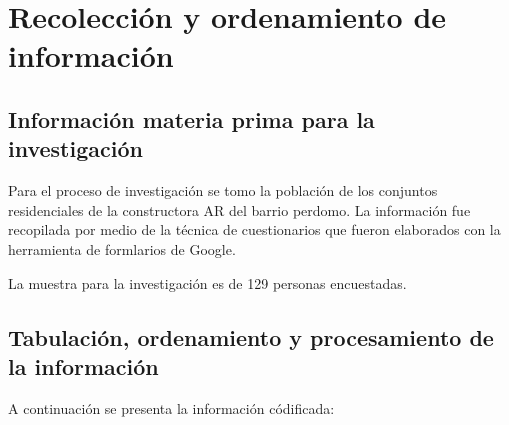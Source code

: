 \chapter{Recolección y ordenamiento de información}
\section{Información materia prima para la investigación}


Para el proceso de investigación se tomo la población de los conjuntos residenciales de la constructora AR del barrio perdomo. La información fue recopilada por medio de la técnica de cuestionarios que fueron elaborados con la herramienta de formlarios de Google. 

La muestra para la investigación es de 129 personas encuestadas.

\section{Tabulación, ordenamiento y procesamiento de la información}

A continuación se presenta la información códificada:


